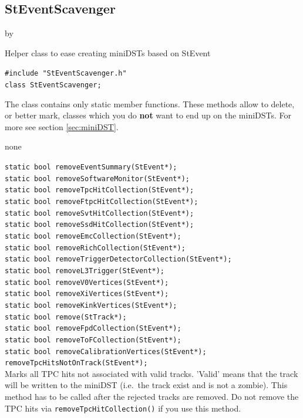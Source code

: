 \documentclass[twoside]{article}
\newcommand{\entrylabel}[1]{\mbox{\textbf{{#1}}}\hfil}%
\newenvironment{entry}
{\begin{list}{}%
    {\renewcommand{\makelabel}{\entrylabel}%
     \setlength{\labelwidth}{90pt}%
     \setlength{\leftmargin}{\labelwidth}
     \advance\leftmargin by \labelsep%
      }%
    }%
  {\end{list}}
\newcommand{\Entrylabel}[1]%
{\raisebox{0pt}[1ex][0pt]{\makebox[\labelwidth][l]%
    {\parbox[t]{\labelwidth}{\hspace{0pt}\textbf{{#1}}}}}}
\newenvironment{Entry}%
{\renewcommand{\entrylabel}{\Entrylabel}\begin{entry}}%
  {\end{entry}}
\begin{document}
\subsection{StEventScavenger}
\label{sec:StEventScavenger}
\begin{Entry}
\item[Summary] Helper class to ease creating miniDSTs based on StEvent
\item[Synopsis]
    \verb+#include "StEventScavenger.h"+\\
    \verb+class StEventScavenger;+\\
\item[Description]
    The class contains only static member functions. These
    methods allow to delete, or better mark, classes which
    you do \textbf{not} want to end up on the miniDSTs.
    For more see section \ref{sec:miniDST}.
\item[Related Classes]
    none
\item[Public\\ Constructors]
    \verb+static bool removeEventSummary(StEvent*);+\\
    \verb+static bool removeSoftwareMonitor(StEvent*);+\\
    \verb+static bool removeTpcHitCollection(StEvent*);+\\
    \verb+static bool removeFtpcHitCollection(StEvent*);+\\
    \verb+static bool removeSvtHitCollection(StEvent*);+\\
    \verb+static bool removeSsdHitCollection(StEvent*);+\\
    \verb+static bool removeEmcCollection(StEvent*);+\\
    \verb+static bool removeRichCollection(StEvent*);+\\
    \verb+static bool removeTriggerDetectorCollection(StEvent*);+\\
    \verb+static bool removeL3Trigger(StEvent*);+\\
    \verb+static bool removeV0Vertices(StEvent*);+\\
    \verb+static bool removeXiVertices(StEvent*);+\\
    \verb+static bool removeKinkVertices(StEvent*);+\\
    \verb+static bool remove(StTrack*);+\\
    \verb+static bool removeFpdCollection(StEvent*);+\\
    \verb+static bool removeToFCollection(StEvent*);+\\
    \verb+static bool removeCalibrationVertices(StEvent*);+\\
    
    \verb+removeTpcHitsNotOnTrack(StEvent*);+\\
    Marks all TPC hits not associated with valid tracks.
    'Valid' means that the track will be written to the miniDST
    (i.e.~the track exist and is not a zombie). This method
    has to be called after the rejected tracks are removed.
    Do not remove the TPC hits via \texttt{removeTpcHitCollection()}
    if you use this method.
\end{Entry}
\clearpage
\end{document}
